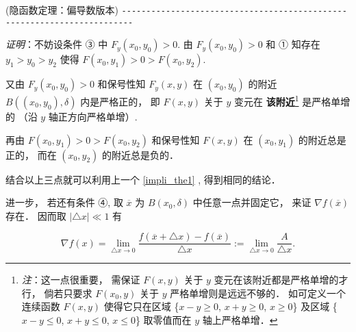 \begin{theorem}{(隐函数定理：偏导数版本)}
\verb|------------------------------------------------------------------------|

\textsl{证明}：不妨设条件 ③ 中 $F_{y}(x_{0},y_{0})>0.$ 由 $F_{y}(x_{0},y_{0})>0$ 和
① 知存在 $y_{1}>y_{0}>y_{2}$ 使得 $F(x_{0},y_{1})>0>F(x_{0},y_{2})$. 

又由 $F_{y}(x_{0},y_{0})>0$ 和保号性知 $F_{y}(x,y)$ 在 $(x_{0},y_{0})$
的附近 $B((x_{0},y_{0}),\delta)$ 内是严格正的， 即 $F(x,y)$ 关于 $y$ 变元在 \textbf{该附近}\footnote{\textsl{注}：这一点很重要， 需保证 $F(x,y)$ 关于 $y$ 变元在该附近都是严格单增的才行， 倘若只要求 $F(x_{0},y)$
关于 $y$ 严格单增则是远远不够的． 如可定义一个连续函数 $F(x,y)$ 使得它只在区域 \{$x-y\geqslant0$,
$x+y\geqslant0$, $x\geqslant0$\} 及区域 \{$x-y\leqslant0$, $x+y\leqslant0$,
$x\leqslant0$\} 取零值而在 $y$ 轴上严格单增． } 是严格单增的 （沿 $y$ 轴正方向严格单增）. 

再由 $F(x_{0},y_{1})>0>F(x_{0},y_{2})$ 和保号性知 $F(x,y)$ 在 $(x_{0},y_{1})$
的附近总是正的， 而在 $(x_{0},y_{2})$ 的附近总是负的． 

结合以上三点就可以利用上一个 \autoref{impli_the1} , 得到相同的结论． 

进一步， 若还有条件 ④, 取 \textbf{$\overline{x}$ }为 $B(x_{0},\delta)$ 中任意一点并固定它， 来证 $\nabla f(\overline{x})$存在． 因而取 $\left|\triangle x\right|\ll1$
有

\begin{equation}\label{impli_eq1}
\nabla f(x)={\displaystyle {\displaystyle \lim_{\triangle x\rightarrow0}}\frac{f(\overline{x}+\triangle x)-f(\overline{x})}{\triangle x}:={\displaystyle \lim_{\triangle x\rightarrow0}}\frac{A}{\triangle x}}.
\end{equation}


\end{theorem}
